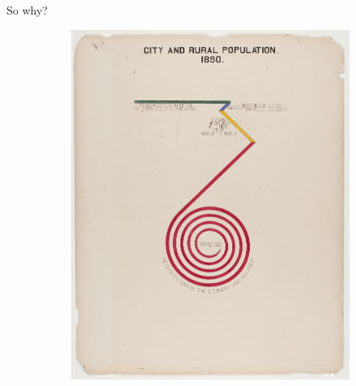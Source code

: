 \documentclass[xcolor={dvipsnames}, handout]{beamer}
\begin{document}
\begin{frame}{So why?}
    \begin{figure}[H]
        \begin{subfigure}{.24\textwidth}
            \includegraphics[width=1\textwidth]{figures/intro/du_bois_spinny.png}
            \caption{}
            \label{fig:intro_dpa}
        \end{subfigure}
        \begin{subfigure}{.24\textwidth}

\end{subfigure}
\end{figure}
\end{frame}
\end{document}
